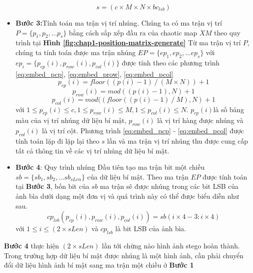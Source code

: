 \begin{itemize}
    \begin{equation}
    \label{eq:s_size_output}
    s = (c \times M \times N \times bc_{lsb})
    \end{equation}
    \item \textbf{Bước 3:}Tính toán ma trận vị trí nhúng.
    Chúng ta có ma trận vị trí $P = \{p_1, p_2,...p_s \}$ bằng cách sắp xếp đầu ra của chaotic map $XM$ theo quy trình tại \textbf{Hình \ref{fig:chap1-position-matrix-generate}}
    Từ ma trận vị trí $P$, chúng ta tính toán được ma trận nhúng $EP = \{ep_1, ep_2,...ep_s \}$ với $ep_i = \{ p_{cp}(i), p_{row}(i), p_{col}(i)\}$ được tính theo các phương trình \ref{eq:embed_pcp}, \ref{eq:embed_prow}, \ref{eq:embed_pcol}
    \begin{equation}
    \label{eq:embed_pcp}
    p_{cp}(i) = floor((p(i) - 1) \mathbin{/}(M \times N)) + 1
    \end{equation}
    \begin{equation}
    \label{eq:embed_prow}
    p_{row}(i) = mod((p(i) -1), N) +1
    \end{equation}
    \begin{equation}
    \label{eq:embed_pcol}
    p_{col}(i) = mod((floor((p(i) -1) \mathbin{/} M),N) +1
    \end{equation}
    với $ 1 \leq p_{cp}(i) \leq c, 1 \leq p_{row}(i) \leq M, 1 \leq p_{col}(i) \leq N.$
    $p_{cp}(i)$là số bảng màu của vị trí nhúng dữ liệu bí mật, $p_{row}(i)$ là vị trí hàng được nhúng và $p_{col}(i)$ là vị trí cột.
    Phương trình \ref{eq:embed_pcp} - \ref{eq:embed_pcol} được tính toán lặp đi lặp lại theo $s$ lần và ma trận vị trí nhúng thu được cung cấp tất cả thông tin về các vị trí nhúng dữ liệu bí mật.
    \item \textbf{Bước 4}: Quy trình nhúng
    Đầu tiên tạo ma trận bit một chiều $sb = \{sb_1, sb_2,...sb_{sLen}\}$ của dữ liệu bí mật. Theo ma trận $EP$ được tính toán tại \textbf{Bước 3}, bốn bit của $sb$ ma trận sẽ được nhúng trong các bit LSB của ảnh bìa dưới dạng một đơn vị và quá trình này có thể được biểu diễn như sau.
    \begin{equation}
    \label{eq:embeđe_process}
    cp_{lsb}(p_{cp}(i), p_{row}(i), p_{col}(i)) = sb(i \times 4 -3 : i \times 4)
    \end{equation}
    với $1 \leq i \leq (2 \times sLen)$ và $cp_{lsb}$ là bit LSB của ảnh bìa.
\end{itemize}
\textbf{Bước 4} thực hiện $(2 \times sLen)$ lần tới chừng nào hình ảnh stego hoàn thành. Trong trường hợp dữ liệu bí mật được nhúng là một hình ảnh, cần phải chuyển đổi dữ liệu hình ảnh bí mật sang ma trận một chiều ở \textbf{Bước 1}
